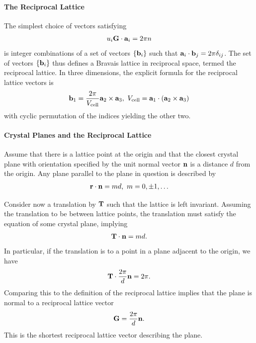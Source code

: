 \paragraph{The Reciprocal Lattice}
The simplest choice of vectors satisfying
\begin{align*}
	u_{i}\vb{G}\cdot\vb{a}_{i} = 2\pi n
\end{align*}
is integer combinations of a set of vectors $\{\vb{b}_{i}\}$ such that $\vb{a}_{i}\cdot\vb{b}_{j} = 2\pi\delta_{ij}$. The set of vectors $\{\vb{b}_{i}\}$ thus defines a Bravais lattice in reciprocal space, termed the reciprocal lattice. In three dimensions, the explicit formula for the reciprocal lattice vectors is
\begin{align*}
	\vb{b}_{1} = \frac{2\pi}{V_{\text{cell}}}\vb{a}_{2}\times\vb{a}_{3},\ V_{\text{cell}} = \vb{a}_{1}\cdot(\vb{a}_{2}\times\vb{a}_{3})
\end{align*}
with cyclic permutation of the indices yielding the other two.

\paragraph{Crystal Planes and the Reciprocal Lattice}
Assume that there is a lattice point at the origin and that the closest crystal plane with orientation specified by the unit normal vector $\vb{n}$ is a distance $d$ from the origin. Any plane parallel to the plane in question is described by
\begin{align*}
	\vb{r}\cdot\vb{n} = md,\ m = 0, \pm 1, \dots
\end{align*}

Consider now a translation by $\vb{T}$ such that the lattice is left invariant. Assuming the translation to be between lattice points, the translation must satisfy the equation of some crystal plane, implying
\begin{align*}
	\vb{T}\cdot\vb{n} = md.
\end{align*}
In particular, if the translation is to a point in a plane adjacent to the origin, we have
\begin{align*}
	\vb{T}\cdot\frac{2\pi}{d}\vb{n} = 2\pi.
\end{align*}
Comparing this to the definition of the reciprocal lattice implies that the plane is normal to a reciprocal lattice vector
\begin{align*}
	\vb{G} = \frac{2\pi}{d}\vb{n}.
\end{align*}
This is the shortest reciprocal lattice vector describing the plane.

